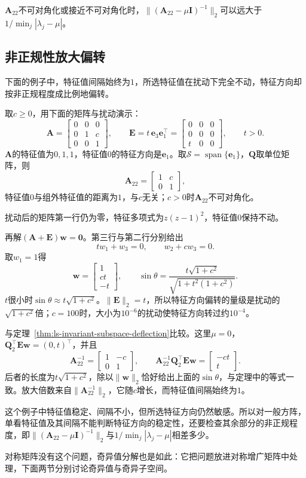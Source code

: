 $\bm A_{22}$不可对角化或接近不可对角化时，$\lVert(\bm A_{22}-\mu\bm I)^{-1}\rVert_2$可以远大于$1/\min_j|\lambda_j-\mu|$。

\subsection{非正规性放大偏转}
下面的例子中，特征值间隔始终为$1$，所选特征值在扰动下完全不动，特征方向却按非正规程度成比例地偏转。
\begin{example}[特征值不动而特征方向偏转]
\label{ex:ls-nonnormal-eigenvector-deflection}
取$c\geq0$，用下面的矩阵与扰动演示：
\[
 \bm A=\begin{bmatrix}0&0&0\\0&1&c\\0&0&1\end{bmatrix},\qquad
 \bm E=t\,\bm e_3\bm e_1^\top=\begin{bmatrix}0&0&0\\0&0&0\\t&0&0\end{bmatrix},\qquad t>0 .
\]
$\bm A$的特征值为$0,1,1$，特征值$0$的特征方向是$\bm e_1$。取$\mathcal S=\operatorname{span}\{\bm e_1\}$，$\bm Q$取单位矩阵，则
\[
 \bm A_{22}=\begin{bmatrix}1&c\\0&1\end{bmatrix},
\]
特征值$0$与组外特征值的距离为$1$，与$c$无关；$c>0$时$\bm A_{22}$不可对角化。

扰动后的矩阵第一行仍为零，特征多项式为$z(z-1)^2$，特征值$0$保持不动。

再解$(\bm A+\bm E)\bm w=\bm0$。第三行与第二行分别给出
\[
 tw_1+w_3=0,\qquad w_2+cw_3=0 .
\]
取$w_1=1$得
\[
 \bm w=\begin{bmatrix}1\\ct\\-t\end{bmatrix},\qquad
 \sin\theta=\frac{t\sqrt{1+c^2}}{\sqrt{1+t^2(1+c^2)}} .
\]
$t$很小时$\sin\theta\approx t\sqrt{1+c^2}$。$\lVert\bm E\rVert_2=t$，所以特征方向偏转的量级是扰动的$\sqrt{1+c^2}$倍；$c=100$时，大小为$10^{-6}$的扰动使特征方向转过约$10^{-4}$。

与定理~\ref{thm:ls-invariant-subspace-deflection}比较。这里$\mu=0$，$\bm Q_2^\top\bm E\bm w=(0,t)^\top$，并且
\[
 \bm A_{22}^{-1}=\begin{bmatrix}1&-c\\0&1\end{bmatrix},\qquad
 \bm A_{22}^{-1}\bm Q_2^\top\bm E\bm w=\begin{bmatrix}-ct\\t\end{bmatrix}.
\]
后者的长度为$t\sqrt{1+c^2}$，除以$\lVert\bm w\rVert_2$恰好给出上面的$\sin\theta$，与定理中的等式一致。放大倍数来自$\lVert\bm A_{22}^{-1}\rVert_2$，它随$c$增长，而特征值间隔始终为$1$。
\end{example}
这个例子中特征值稳定、间隔不小，但所选特征方向仍然敏感。所以对一般方阵，单看特征值及其间隔不能判断特征方向的稳定性，还要检查其余部分的非正规程度，即$\lVert(\bm A_{22}-\mu\bm I)^{-1}\rVert_2$与$1/\min_j|\lambda_j-\mu|$相差多少。

对称矩阵没有这个问题，奇异值分解也是如此：它把问题放进对称增广矩阵中处理，下面两节分别讨论奇异值与奇异子空间。
